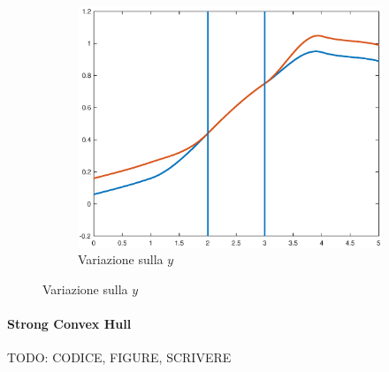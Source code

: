 \documentclass[a4paper, 10pt]{article}
\begin{document}
\begin{figure}[]
\begin{subfigure}[b]{0.3\textwidth}
      \includegraphics[width=\textwidth]{figure/loc4.eps}
      \caption{Variazione sulla $y$}
      \label{fig:loc4}
  \end{subfigure}
  \label{fig:loc_spline}
\end{figure} 

\paragraph{Strong Convex Hull}

TODO: CODICE, FIGURE, SCRIVERE
\end{document}
